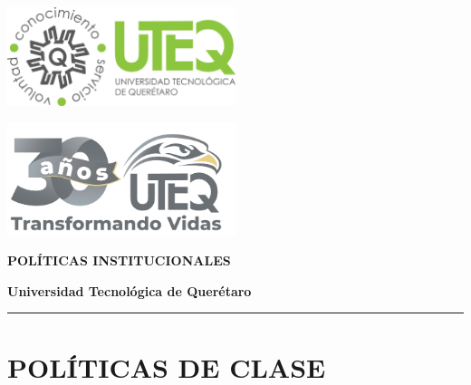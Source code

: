 \documentclass[10pt,letterpaper]{article}
\begin{document}
	
	\begin{center}
		\begin{minipage}{0.45\textwidth}
			\begin{center}
				\includegraphics[width=0.5\textwidth]{Imagenes/Logo_uteq.png}
			\end{center}
		\end{minipage}%
		\hfill
		\begin{minipage}{0.45\textwidth}
			\begin{center}
				\includegraphics[width=0.5\textwidth]{Imagenes/Logo_uteq_30.png}
			\end{center}
		\end{minipage}
		
		\vspace{0.5cm}
		{\color{uteqGreen}\huge\bfseries POLÍTICAS INSTITUCIONALES}
		
		\vspace{0.3cm}
		{\large\bfseries Universidad Tecnológica de Querétaro}
		
		\rule{\textwidth}{3pt}
	\end{center}
	
	
	\section*{\color{uteqGreen}POLÍTICAS DE CLASE}
	
\end{document}
